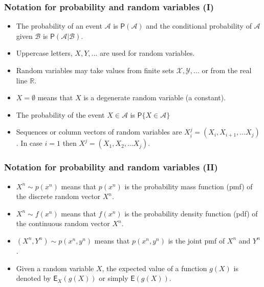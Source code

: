 \documentclass{beamer}
\begin{document}
\begin{frame}
\frametitle{Notation for probability and random variables (I)}
\begin{itemize}
\item The probability of an event $\mathcal A$ is $\mathsf P(\mathcal A)$ and the conditional probability of $\mathcal A$ given $\mathcal B$ is $\mathsf P(\mathcal A|\mathcal B)$.
\item Uppercase letters, $X,Y,...$ are used for random variables.
\item Random variables may take values from finite sets $\mathcal{X,Y, ...}$ or from the real line $\mathbb R$.
\item $X=\emptyset$ means that $X$ is a degenerate random variable (a constant).
\item The probability of the event $X\in \mathcal A$ is $\mathsf P\{X\in \mathcal A\}$
\item Sequences or column vectors of random variables are $X_i^j=(X_i, X_{i+1}, ...X_j)$. In case $i=1$ then $X^j=(X_1, X_2, ...X_j)$.
\end{itemize}
\end{frame}


\begin{frame}
\frametitle{Notation for probability and random variables (II)}
\begin{itemize}
\item $X^n \sim p(x^n)$ means that $p(x^n)$ is the probability mass function (pmf) of the discrete random vector $X^n$.
\item $X^n \sim f(x^n)$ means that $f(x^n)$ is the probability density function (pdf) of the continuous random vector $X^n$.
\item $(X^n, Y^n)\sim p(x^n,y^n)$ means that $p(x^n,y^n)$ is the joint pmf of $X^n$ and $Y^n$.
\item Given a random variable $X$, the expected value of a function $g(X)$ is denoted by $\mathsf E_X(g(X))$ or simply $\mathsf E(g(X))$.

\end{itemize}
\end{frame}
\end{document}
